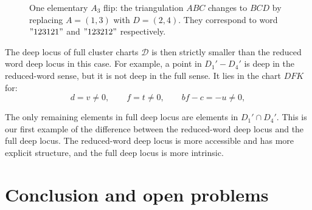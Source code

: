 \documentclass[12pt]{amsart}
\newcommand{\cD}{\mathcal D}
\theoremstyle{plain}
\theoremstyle{definition}
\theoremstyle{remark}
\begin{document}
\begin{figure}[ht]
\centering
{}
\caption{One elementary $A_3$ flip: the triangulation $ABC$ changes to $BCD$ by replacing $A=(1,3)$ with $D=(2,4)$. They correspond to word $"123121"$ and $"123212"$ respectively.}
\label{fig:sl4_hexagon_flip}
\end{figure}

The deep locus of full cluster charts $\cD$ is then strictly smaller than the reduced word deep locus in this case. For example, a point in $D_1'-D_4'$ is deep in the reduced-word sense, but it is not deep in the full sense. It lies in the chart $DFK$ for: 
\[
d=v \neq 0,\qquad f=t \neq 0,\qquad bf-c=-u \neq 0,
\]

The only remaining elements in full deep locus are elements in $D_1'\cap D_4'$. This is our first example of the difference between the reduced-word deep locus and the full deep locus.  The reduced-word deep locus is more accessible and has more explicit structure, and the full deep locus is more intrinsic. 

\section{Conclusion and open problems}
\label{sec:conclusion-open}
\end{document}
